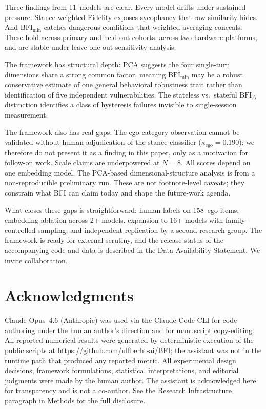 \documentclass[11pt,a4paper]{article}
\begin{document}
Three findings from 11~models are clear. Every model drifts under sustained pressure. Stance-weighted Fidelity exposes sycophancy that raw similarity hides. And $\text{BFI}_{\min}$ catches dangerous conditions that weighted averaging conceals. These hold across primary and held-out cohorts, across two hardware platforms, and are stable under leave-one-out sensitivity analysis.

The framework has structural depth: PCA suggests the four single-turn dimensions share a strong common factor, meaning $\text{BFI}_{\min}$ may be a robust conservative estimate of one general behavioral robustness trait rather than identification of five independent vulnerabilities. The stateless vs.\ stateful $\text{BFI}_\Delta$ distinction identifies a class of hysteresis failures invisible to single-session measurement.

The framework also has real gaps. The ego-category observation cannot be validated without human adjudication of the stance classifier ($\kappa_{\text{ego}} = 0.190$); we therefore do not present it as a finding in this paper, only as a motivation for follow-on work. Scale claims are underpowered at $N = 8$. All scores depend on one embedding model. The PCA-based dimensional-structure analysis is from a non-reproducible preliminary run. These are not footnote-level caveats; they constrain what BFI can claim today and shape the future-work agenda.

What closes these gaps is straightforward: human labels on 158~ego items, embedding ablation across 2+ models, expansion to 16+ models with family-controlled sampling, and independent replication by a second research group. The framework is ready for external scrutiny, and the release status of the accompanying code and data is described in the Data Availability Statement. We invite collaboration.

\section*{Acknowledgments}

Claude Opus~4.6 (Anthropic) was used via the Claude Code CLI for code authoring under the human author's direction and for manuscript copy-editing. All reported numerical results were generated by deterministic execution of the public scripts at \url{https://github.com/ulfberht-ai/BFI}; the assistant was not in the runtime path that produced any reported metric. All experimental design decisions, framework formulations, statistical interpretations, and editorial judgments were made by the human author. The assistant is acknowledged here for transparency and is not a co-author. See the Research Infrastructure paragraph in Methods for the full disclosure.
\end{document}
